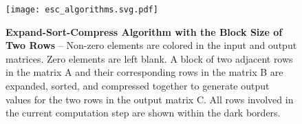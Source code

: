 \begin{figure}[tp]
    \centering
    \texttt{[image: esc\_algorithms.svg.pdf]}
    \caption[Expand-Sort-Compress Algorithm]{
      \textbf{Expand-Sort-Compress Algorithm with the Block Size of Two Rows} --
      Non-zero elements are colored in the input and output matrices.
      Zero elements are left blank.
      A block of two adjacent rows in the matrix A and their corresponding rows
      in the matrix B are expanded, sorted, and compressed together to generate
      output values for the two rows in the output matrix C.
      All rows involved in the current computation step are shown within the
      dark borders.
    }
    \label{fig-spz-esc-algorithm}
\end{figure}
